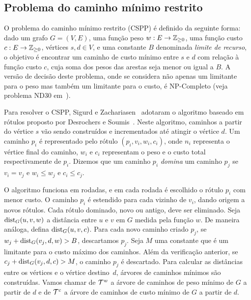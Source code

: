 \subsection{Problema do caminho mínimo restrito}
O problema do caminho mínimo restrito (CSPP) é definido da seguinte forma:
dado um grafo $G = (V,E)$, uma função peso $w: E \to \mathbb{Z}_{\ge 0}$, uma
função custo $c: E \to \mathbb{Z}_{\ge 0}$, vértices $s,d \in V$, e uma
constante $B$ denominada \emph{limite de recurso}, o objetivo é encontrar
um caminho de custo mínimo entre $s$ e $d$ com relação à função custo $c$,
cuja soma dos pesos das arestas seja menor ou igual a $B$. A versão de decisão
deste problema, onde se considera não apenas um limitante para o peso mas
também um limitante para o custo, é NP-Completo
(veja problema ND30 em~\cite{GareyJ1990}).

Para resolver o CSPP, Sigurd e Zachariasen~\cite{SigurdZ2004} adotaram
o algoritmo baseado em rótulos proposto por
Desrochers e Soumis~\cite{DesrochersS1988}. Neste algoritmo, caminhos a
partir do vértice $s$ vão sendo construídos e incrementados até atingir
o vértice $d$. Um caminho $p_i$ é representado pelo rótulo
$(p_i, v_i, w_i, c_i)$, onde $n_i$ representa o vértice final do caminho,
$w_i$ e $c_i$ representam o peso e o custo total respectivamente de $p_i$.
Dizemos que um caminho $p_i$ \textit{domina} um caminho $p_j$ se $v_i = v_j$ e
$w_i \le w_j$ e $c_i \le c_j$.

O algoritmo funciona em rodadas, e em cada rodada é escolhido o rótulo
$p_i$ com menor custo. O caminho $p_i$ é estendido para
cada vizinho de $v_i$, dando origem a novos rótulos. Cada rótulo dominado,
novo ou antigo, deve ser eliminado.
Seja ${\mathrm{dist}}_{G}(u,v,w)$ a distância entre  $u$ e $v$ em $G$ medida pela
função $w$. De maneira análoga, defina ${\mathrm{dist}}_{G}(u,v,c)$. 
Para cada novo caminho criado $p_j$, se $w_j + {\mathrm{dist}}_{G}(v_j,d,w) > B$,
 descartamos $p_j$. Seja $M$ uma constante que é um limitante para o custo máximo
dos caminhos. Além da verificação anterior, se
$c_j + {\mathrm{dist}}_{G}(v_j,d,c) > M$, o caminho $p_j$ é descartado.
Para calcular as distâncias entre os vértices e o vértice destino~$d$,
árvores de caminhos mínimos são construídas. 
Vamos chamar de $\mathcal{T}^{w}$ a árvore
de caminhos de peso mínimo de $G$ a partir de $d$ e de $\mathcal{T}^{c}$ a árvore
de caminhos de custo mínimo de $G$ a partir de $d$.

